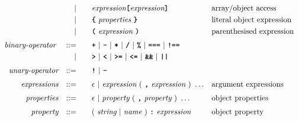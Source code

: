 \begin{alignat*}{9}
&&                       && |   &\quad && \textit{expression} \textbf{\texttt{[}}
                                          \textit{expression} \textbf{\texttt{]}}
                                                           && \textrm{array/object access} \\
&&                       && |   &\quad &&   \textbf{\texttt{\{}}\ 
                                            \textit{properties}\
                                            \textbf{\texttt{\}}}
                                                           && \textrm{literal object expression}\\
&&                       && |   &\quad &&  \textbf{\texttt{(}}\  \textit{expression} \ 
                                            \textbf{\texttt{)}} && \textrm{parenthesised expression}\\[1mm]
&& \textit{binary-operator}    \ 
                        && ::= &\quad && \textbf{\texttt{+}}\ |\ \textbf{\texttt{-}}\ |\ \textbf{\texttt{*}}\ |\ \textbf{\texttt{/}}\ |\ \textbf{\texttt{\%}}\ |\ 
                                   \textbf{\texttt{===}}\ |\ \textbf{\texttt{!==}}\ \\
&&                       && |  &\quad &&  \texttt{\textbf{>}}\ |\ \texttt{\textbf{<}}\ |\ \texttt{\textbf{>=}}\ |\ \texttt{\textbf{<=}}\
                                          |\ \textbf{\texttt{\&\&}}\ |\ \texttt{\textbf{||}}\  \\[1mm]
&& \textit{unary-operator}    
                        && ::= &\quad && \textbf{\texttt{!}}\ |\ \textbf{\texttt{-}}\\[1mm]
&& \textit{expressions}  && ::= &\quad && \epsilon\ | \ \textit{expression}\ (
                                                               \ \textbf{\texttt{,}} \
                                                                 \textit{expression} \ 
                                                                      )\ \ldots
                                                            && \textrm{argument expressions} \\[1mm]
&& \textit{properties}  && ::= &\quad && \epsilon\ | \ \textit{property}\ (
                                                               \ \textbf{\texttt{,}} \
                                                                 \textit{property} \ 
                                                                      )\ \ldots
                                                            && \textrm{object properties} \\[1mm]
&& \textit{property}  && ::= &\quad && (\ \textit{string}\ |\ \textit{name}\ ) 
                                        \ \textbf{\texttt{:}} \ \textit{expression} 
                                                            && \textrm{object property}
\end{alignat*}

